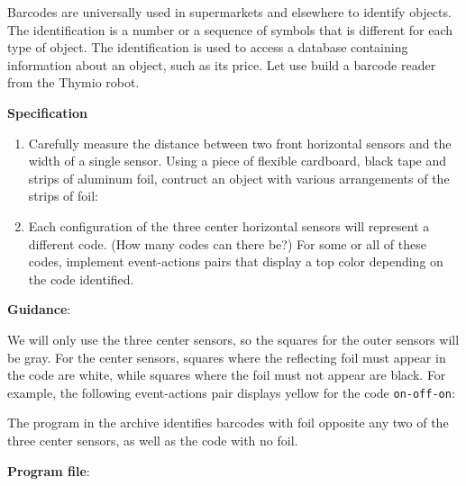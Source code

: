 \label{ch.barcode}

Barcodes are universally used in supermarkets and elsewhere to identify
objects. The identification is a number or a sequence of symbols that is
different for each type of object. The identification is used to access
a database containing information about an object, such as its price.
Let use build a barcode reader from the Thymio robot.

\textbf{Specification}

\begin{enumerate}
\item Carefully measure the distance between two front horizontal
sensors and the width of a single sensor.
Using a piece of flexible cardboard, black tape and strips of aluminum
foil, contruct an object with various arrangements of the strips of foil:

\begin{center}
\end{center}

\item Each configuration of the three center horizontal sensors will
represent a different code. (How many codes can there be?) For some or
all of these codes, implement event-actions pairs that display a top
color depending on the code identified.

\end{enumerate}

\textbf{Guidance}:

We will only use the three center sensors, so the squares for the
outer sensors will be gray. For the center sensors, squares where the
reflecting foil must appear in the code are white, while squares where
the foil must not appear are black. For example, the following
event-actions pair displays yellow for the code \texttt{on-off-on}:


The program in the archive identifies barcodes with foil opposite any
two of the three center sensors, as well as the code with no foil.

{\raggedleft \hfill \textbf{Program file}: }

